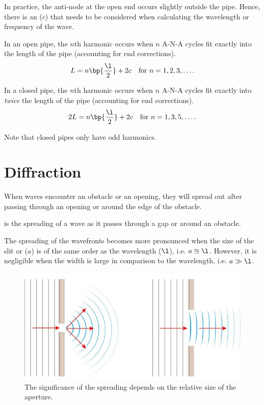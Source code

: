 In practice, the anti-node at the open end occurs slightly outside the pipe. Hence, there is an  ($c$) that needs to be considered when calculating the wavelength or frequency of the wave.

\begin{proposition}
    In an open pipe, the $n$th harmonic occurs when $n$ A-N-A cycles fit exactly into the length of the pipe (accounting for end corrections). \[L = n \bp{\frac{\l}{2}} + 2c \quad \text{for $n = 1, 2, 3, \dots$}.\]
\end{proposition}

\begin{proposition}
    In a closed pipe, the $n$th harmonic occurs when $n$ A-N-A cycles fit exactly into \emph{twice} the length of the pipe (accounting for end corrections).\[2L = n \bp{\frac\l2} + 2c \quad \text{for $n = 1, 3, 5, \dots$}.\]
\end{proposition}

Note that closed pipes only have odd harmonics.

\section{Diffraction}

When waves encounter an obstacle or an opening, they will spread out after passing through an opening or around the edge of the obstacle.

\begin{definition}
     is the spreading of a wave as it passes through a gap or around an obstacle.
\end{definition}

The spreading of the wavefronts becomes more pronounced when the size of the slit or  ($a$) is of the same order as the wavelength ($\l$), i.e. $a \approxeq \l$. However, it is negligible when the width is large in comparison to the wavelength, i.e. $a \gg \l$.

\begin{figure}[H]
    \centering
    \includegraphics[scale=0.4]{media/Apeture.jpg}
    \caption{The significance of the spreading depends on the relative size of the aperture.\protect\footnotemark}
\end{figure}

